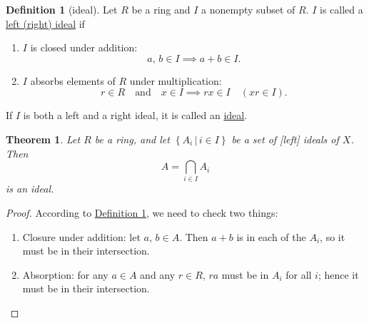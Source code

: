 \documentclass[a4paper]{report}
\newcommand{\defn}[1]{\ul{#1}}
\theoremstyle{definition}
\newtheorem{definition}{Definition}[section]
\theoremstyle{plain}
\newtheorem{theorem}{Theorem}[section]
\theoremstyle{remark}
\begin{document}
\begin{definition}[ideal]
  \label{def:ideal}
  Let $R$ be a ring and $I$ a nonempty subset of $R$. $I$ is called a \defn{left (right) ideal} if
  \begin{enumerate}
    \item $I$ is closed under addition:
      \begin{equation*}
        a,\,b \in I \implies a+b\in I.
      \end{equation*}

    \item $I$ absorbs elements of $R$ under multiplication:
      \begin{equation*}
        r \in R \quad\text{and}\quad x\in I \implies rx \in I\quad (xr \in I).
      \end{equation*}
  \end{enumerate}
  If $I$ is both a left and a right ideal, it is called an \defn{ideal}.
\end{definition}
\begin{theorem}
  Let $R$ be a ring, and let $\left\{ A_{i}\,\big|\, i \in I \right\}$ be a set of [left] ideals of $X$. Then 
  \begin{equation*}
    A = \bigcap_{i \in I}A_{i}
  \end{equation*}
  is an ideal.
  \label{thm:intersectionofidealsisideal}
\end{theorem}
\begin{proof}
  According to \hyperref[def:ideal]{Definition \ref*{def:ideal}}, we need to check two things:
  \begin{enumerate}
    \item Closure under addition: let $a$, $b\in A$. Then $a+b$ is in each of the $A_{i}$, so it must be in their intersection.
    \item Absorption: for any $a \in A$ and any $r \in R$, $ra$ must be in $A_{i}$ for all $i$; hence it must be in their intersection.
  \end{enumerate}
\end{proof}
\end{document}
